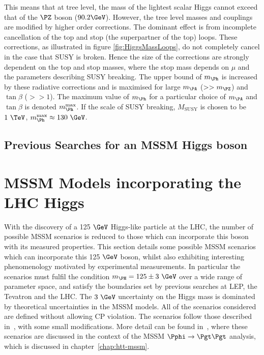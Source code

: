 This means that at tree level, the mass of the lightest scalar Higgs cannot
exceed that of the $\PZ$ boson ($90.2\GeV$). However, the tree level masses and
couplings are modified by higher order corrections. The dominant effect is from
incomplete cancellation of the top and stop (the superpartner of the top) loops.
These corrections, as illustrated in figure \ref{fig:HiggsMassLoops}, do not
completely cancel in the case that SUSY is broken. Hence the size of the
corrections are strongly dependent on the top and stop masses, where the stop
mass depends on $\mu$ and the parameters describing SUSY breaking. The upper
bound of $m_{\Ph}$ is increased by these radiative corrections and is maximised
for large $m_{\PA}$ ($>>m_{\PZ}$) and $\tan\beta$ ($>>1$). The maximum value of
$m_{\Ph}$ for a particular choice of $m_{\PA}$ and $\tan\beta$ is denoted
$m_{\Ph}^{\text{max}}$. If the scale of SUSY breaking, $M_{\text{SUSY}}$ is
chosen to be $1~\TeV$, $m_{\Ph}^{\text{max}} \approx 130~\GeV$. 

\subsection{Previous Searches for an MSSM Higgs boson}
\label{sec:previousSMsearches}

\section{MSSM Models incorporating the LHC Higgs}
\label{sec:mssmbenchmarks}

With the discovery of a 125$~\GeV$ Higgs-like particle at the LHC, the number of
possible MSSM scenarios is reduced to those which can incorporate this boson
with its measured properties. This section details some possible MSSM scenarios
which can incorporate this 125$~\GeV$ boson, whilst also exhibiting interesting
phenomenology motivated by experimental measurements. In particular the
scenarios must fulfil the condition $m_{\PH} = 125 \pm 3~\GeV$ over a wide range
of parameter space, and satisfy the boundaries set by previous searches at LEP,
the Tevatron and the LHC. The $3~\GeV$ uncertainty on the Higgs mass is
dominated by theoretical uncertainties in the MSSM models. All of the scenarios 
considered are defined without allowing CP violation. The scenarios follow those
described in~\cite{MSSMScenarios}, with some small modifications. More detail
can be found in~\cite{HIG-13-021}, where these scenarios are discussed in the context
of the MSSM $\Pphi \to \Pgt\Pgt$ analysis, which is discussed in
chapter~\ref{chap:htt-mssm}. 

